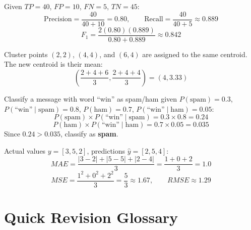 \documentclass[11pt,a4paper]{article}
\begin{document}
\begin{examplebox}
Given $TP=40$, $FP=10$, $FN=5$, $TN=45$:
$$
\text{Precision} = \frac{40}{40+10} = 0.80, \qquad \text{Recall} = \frac{40}{40+5} \approx 0.889
$$
$$
F_1 = \frac{2(0.80)(0.889)}{0.80+0.889} \approx 0.842
$$
\end{examplebox}

\begin{examplebox}
Cluster points $(2,2)$, $(4,4)$, and $(6,4)$ are assigned to the same centroid. The new centroid is their mean:
$$
\left(\frac{2+4+6}{3}, \frac{2+4+4}{3}\right) = (4, 3.33)
$$
\end{examplebox}

\begin{examplebox}
Classify a message with word ``win'' as spam/ham given $P(\text{spam})=0.3$, $P(\text{``win''}\mid\text{spam})=0.8$, $P(\text{ham})=0.7$, $P(\text{``win''}\mid\text{ham})=0.05$:
$$
P(\text{spam})\times P(\text{``win''}\mid\text{spam}) = 0.3 \times 0.8 = 0.24
$$
$$
P(\text{ham})\times P(\text{``win''}\mid\text{ham}) = 0.7 \times 0.05 = 0.035
$$
Since $0.24 > 0.035$, classify as \textbf{spam}.
\end{examplebox}

\begin{examplebox}
Actual values $y = [3, 5, 2]$, predictions $\hat{y} = [2, 5, 4]$:
$$
MAE = \frac{|3-2|+|5-5|+|2-4|}{3} = \frac{1+0+2}{3} = 1.0
$$
$$
MSE = \frac{1^2+0^2+2^2}{3} = \frac{5}{3} \approx 1.67, \qquad RMSE \approx 1.29
$$
\end{examplebox}

\section{Quick Revision Glossary}
\end{document}
